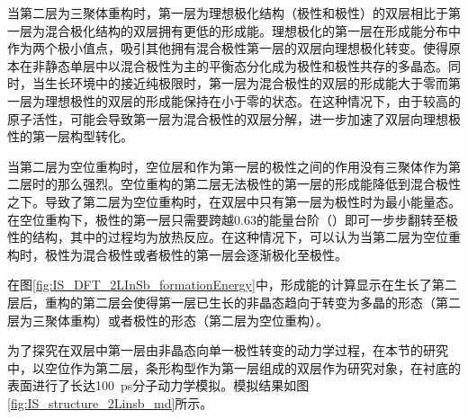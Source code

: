 当第二层为三聚体重构时，第一层为理想极化结构（极性和极性）的双层相比于第一层为混合极化结构的双层拥有更低的形成能。理想极化的第一层在形成能分布中作为两个极小值点，吸引其他拥有混合极性第一层的双层向理想极化转变。使得原本在非静态单层中以混合极性为主的平衡态分化成为极性和极性共存的多晶态。同时，当生长环境中的接近纯极限时，第一层为混合极性的双层的形成能大于零而第一层为理想极性的双层的形成能保持在小于零的状态。在这种情况下，由于较高的原子活性，可能会导致第一层为混合极性的双层分解，进一步加速了双层向理想极性的第一层构型转化。

当第二层为空位重构时，空位层和作为第一层的极性之间的作用没有三聚体作为第二层时的那么强烈。空位重构的第二层无法极性的第一层的形成能降低到混合极性之下。导致了第二层为空位重构时，在双层中只有第一层为极性时为最小能量态。在空位重构下，极性的第一层只需要跨越\SI{0.63}{\mievpas}的能量台阶（）即可一步步翻转至极性的结构，其中的过程均为放热反应。在这种情况下，可以认为当第二层为空位重构时，极性为混合极性或者极性的第一层会逐渐极化至极性。

在图\ref{fig:IS_DFT_2LInSb_formationEnergy}中，形成能的计算显示在生长了第二层后，重构的第二层会使得第一层已生长的非晶态趋向于转变为多晶的形态（第二层为三聚体重构）或者极性的形态（第二层为空位重构）。

为了探究在双层中第一层由非晶态向单一极性转变的动力学过程，在本节的研究中，以空位作为第二层，条形构型作为第一层组成的双层作为研究对象，在衬底的表面进行了长达\SI{100}{\pico\second}分子动力学模拟。模拟结果如图\ref{fig:IS_structure_2Linsb_md}所示。

